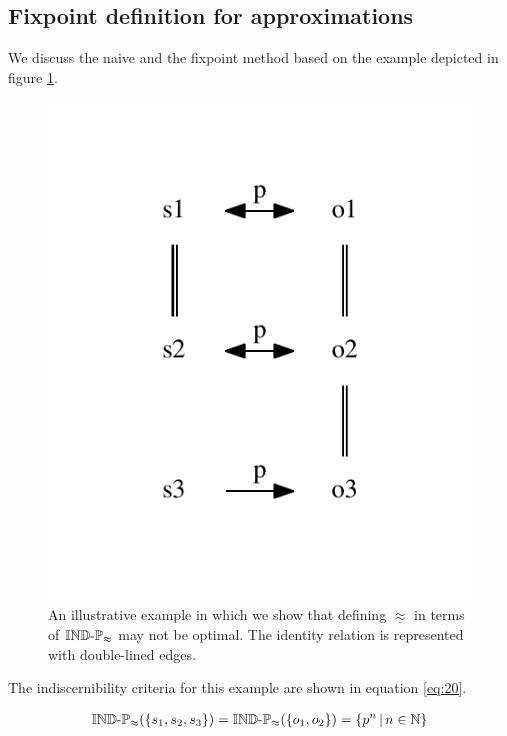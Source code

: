 \subsection{Fixpoint definition for approximations}

We discuss the naive and the fixpoint method based on the example
  depicted in figure \ref{fig:example}.

\begin{figure}
\label{fig:example}
\centering
\includegraphics{./img/fixpoint_example}%
\caption{
  An illustrative example in which we show that defining
  $\underline{\approx}$ in terms of $\operatorname{{\mathbb{IND}-\mathbb{P}}}_{\approx}$ may not be optimal.
  The identity relation is represented with double-lined edges.
}
\end{figure}


The indiscernibility criteria for this example are shown
  in equation \ref{eq:20}.

\small
\begin{align}
\label{eq:20}
  \operatorname{{\mathbb{IND}-\mathbb{P}}}_{\approx}(\{s_1,s_2,s_3\})
=
  \operatorname{{\mathbb{IND}-\mathbb{P}}}_{\approx}(\{o_1,o_2\})
=
  \{p^n\,\vert\,n \in \mathbb{N}\}
\end{align}
\normalsize

